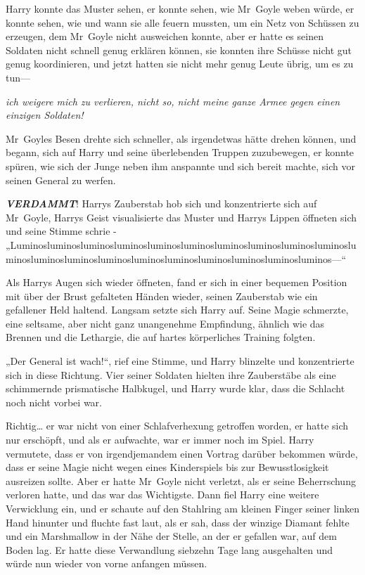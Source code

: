 {Harry konnte das Muster sehen, er konnte sehen, wie Mr~Goyle weben würde, er konnte sehen, wie und wann sie alle feuern mussten, um ein Netz von Schüssen zu erzeugen, dem Mr~Goyle nicht ausweichen konnte, aber er hatte es seinen Soldaten nicht schnell genug erklären können, sie konnten ihre Schüsse nicht gut genug koordinieren, und jetzt hatten sie nicht mehr genug Leute übrig, um es zu tun—

\emph{ich weigere mich zu verlieren, nicht so, nicht meine ganze Armee gegen einen einzigen Soldaten!}

Mr~Goyles Besen drehte sich schneller, als irgendetwas hätte drehen können, und begann, sich auf Harry und seine überlebenden Truppen zuzubewegen, er konnte spüren, wie sich der Junge neben ihm anspannte und sich bereit machte, sich vor seinen General zu werfen.

\textbf{\emph{VERDAMMT}}! Harrys Zauberstab hob sich und konzentrierte sich auf Mr~Goyle, Harrys Geist visualisierte das Muster und Harrys Lippen öffneten sich und seine Stimme schrie - „Luminosluminosluminosluminosluminosluminosluminosluminosluminosluminosluminosluminosluminosluminosluminosluminosluminosluminosluminosluminos—“

Als Harrys Augen sich wieder öffneten, fand er sich in einer bequemen Position mit über der Brust gefalteten Händen wieder, seinen Zauberstab wie ein gefallener Held haltend. Langsam setzte sich Harry auf. Seine Magie schmerzte, eine seltsame, aber nicht ganz unangenehme Empfindung, ähnlich wie das Brennen und die Lethargie, die auf hartes körperliches Training folgten.

„Der General ist wach!“, rief eine Stimme, und Harry blinzelte und konzentrierte sich in diese Richtung. Vier seiner Soldaten hielten ihre Zauberstäbe als eine schimmernde prismatische Halbkugel, und Harry wurde klar, dass die Schlacht noch nicht vorbei war.

Richtig… er war nicht von einer Schlafverhexung getroffen worden, er hatte sich nur erschöpft, und als er aufwachte, war er immer noch im Spiel. Harry vermutete, dass er von irgendjemandem einen Vortrag darüber bekommen würde, dass er seine Magie nicht wegen eines Kinderspiels bis zur Bewusstlosigkeit ausreizen sollte. Aber er hatte Mr~Goyle nicht verletzt, als er seine Beherrschung verloren hatte, und das war das Wichtigste. Dann fiel Harry eine weitere Verwicklung ein, und er schaute auf den Stahlring am kleinen Finger seiner linken Hand hinunter und fluchte fast laut, als er sah, dass der winzige Diamant fehlte und ein Marshmallow in der Nähe der Stelle, an der er gefallen war, auf dem Boden lag. Er hatte diese Verwandlung siebzehn Tage lang ausgehalten und würde nun wieder von vorne anfangen müssen.

}
